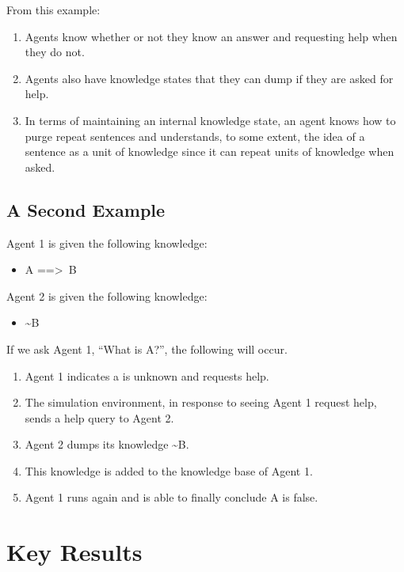 \documentclass{article}
\begin{document}
From this example:

\begin{enumerate}
	\item Agents know whether or not they know an answer and requesting help when they do not.
	\item Agents also have knowledge states that they can dump if they are asked for help.
	\item In terms of maintaining an internal knowledge state, an agent knows how to purge repeat sentences and understands, to some extent, the idea of a sentence as a unit of knowledge since it can repeat units of knowledge when asked.
\end{enumerate}

\subsection{A Second Example}
\label{example_2}

Agent 1 is given the following knowledge:

\begin{itemize}
	\item A ==\textgreater \, B
\end{itemize}

Agent 2 is given the following knowledge:

\begin{itemize}
	\item \textasciitilde B
\end{itemize}

If we ask Agent 1, ``What is A?'', the following will occur.

\begin{enumerate}
	\item Agent 1 indicates a is unknown and requests help.
	\item The simulation environment, in response to seeing Agent 1 request help, sends a help query to Agent 2.
	\item Agent 2 dumps its knowledge \textasciitilde B.
	\item This knowledge is added to the knowledge base of Agent 1.
	\item Agent 1 runs again and is able to finally conclude A is false.
\end{enumerate}

\section{Key Results}
\end{document}
